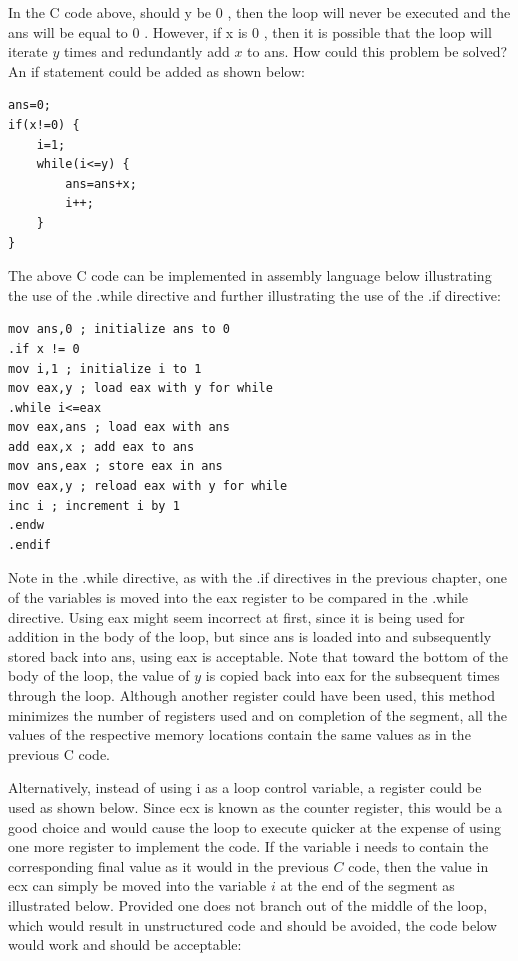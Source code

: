 \documentclass[10pt]{article}
\begin{document}
In the C code above, should y be 0 , then the loop will never be executed and the ans will be equal to 0 . However, if x is 0 , then it is possible that the loop will iterate $y$ times and redundantly add $x$ to ans. How could this problem be solved? An if statement could be added as shown below:

\begin{verbatim}
ans=0;
if(x!=0) {
    i=1;
    while(i<=y) {
        ans=ans+x;
        i++;
    }
}
\end{verbatim}

The above C code can be implemented in assembly language below illustrating the use of the .while directive and further illustrating the use of the .if directive:

\begin{verbatim}
mov ans,0 ; initialize ans to 0
.if x != 0
mov i,1 ; initialize i to 1
mov eax,y ; load eax with y for while
.while i<=eax
mov eax,ans ; load eax with ans
add eax,x ; add eax to ans
mov ans,eax ; store eax in ans
mov eax,y ; reload eax with y for while
inc i ; increment i by 1
.endw
.endif
\end{verbatim}

Note in the .while directive, as with the .if directives in the previous chapter, one of the variables is moved into the eax register to be compared in the .while directive. Using eax might seem incorrect at first, since it is being used for addition in the body of the loop, but since ans is loaded into and subsequently stored back into ans, using eax is acceptable. Note that toward the bottom of the body of the loop, the value of $y$ is copied back into eax for the subsequent times through the loop. Although another register could have been used, this method minimizes the number of registers used and on completion of the segment, all the\\
values of the respective memory locations contain the same values as in the previous C code.

Alternatively, instead of using i as a loop control variable, a register could be used as shown below. Since ecx is known as the counter register, this would be a good choice and would cause the loop to execute quicker at the expense of using one more register to implement the code. If the variable i needs to contain the corresponding final value as it would in the previous $C$ code, then the value in ecx can simply be moved into the variable $i$ at the end of the segment as illustrated below. Provided one does not branch out of the middle of the loop, which would result in unstructured code and should be avoided, the code below would work and should be acceptable:
\end{document}
